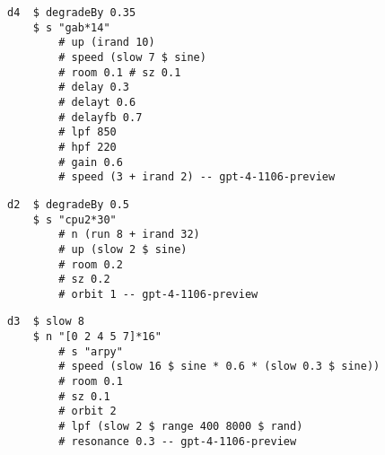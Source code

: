\begin{minipage}[t]{1\textwidth}
    \centering
    \begin{lstlisting}[style=SuperCollider-IDE, language=ExtendedHaskell, basicstyle=\footnotesize\ttfamily, numbers=none]
d4  $ degradeBy 0.35 
    $ s "gab*14" 
        # up (irand 10) 
        # speed (slow 7 $ sine) 
        # room 0.1 # sz 0.1 
        # delay 0.3 
        # delayt 0.6 
        # delayfb 0.7 
        # lpf 850
        # hpf 220 
        # gain 0.6
        # speed (3 + irand 2) -- gpt-4-1106-preview                         
    \end{lstlisting}
    \vspace{1cm}
\end{minipage}




\begin{minipage}[t]{1\textwidth}
    \centering
    \begin{lstlisting}[style=SuperCollider-IDE, language=ExtendedHaskell, basicstyle=\footnotesize\ttfamily, numbers=none]
d2  $ degradeBy 0.5 
    $ s "cpu2*30" 
        # n (run 8 + irand 32) 
        # up (slow 2 $ sine) 
        # room 0.2 
        # sz 0.2 
        # orbit 1 -- gpt-4-1106-preview                      
    \end{lstlisting}
    \vspace{1cm}
\end{minipage}





\begin{minipage}[t]{1\textwidth}
    \centering
    \begin{lstlisting}[style=SuperCollider-IDE, language=ExtendedHaskell, basicstyle=\footnotesize\ttfamily, numbers=none]
d3  $ slow 8 
    $ n "[0 2 4 5 7]*16" 
        # s "arpy" 
        # speed (slow 16 $ sine * 0.6 * (slow 0.3 $ sine)) 
        # room 0.1 
        # sz 0.1 
        # orbit 2 
        # lpf (slow 2 $ range 400 8000 $ rand) 
        # resonance 0.3 -- gpt-4-1106-preview                    
    \end{lstlisting}
    \vspace{1cm}
\end{minipage}







